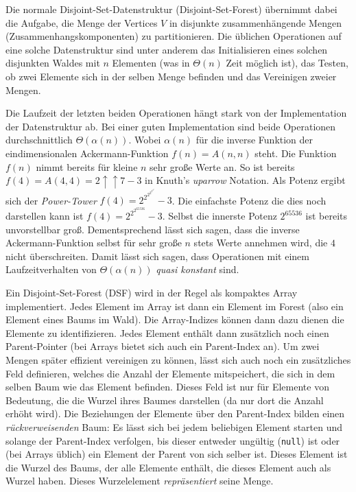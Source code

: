\documentclass{whswinvcbook}
\begin{document}
Die normale Disjoint-Set-Datenstruktur (Disjoint-Set-Forest) \cite{dsf} übernimmt dabei die Aufgabe, die Menge der Vertices $V$ in disjunkte zusammenhängende Mengen (Zusammenhangskomponenten) zu partitionieren. Die üblichen Operationen auf eine solche Datenstruktur sind unter anderem das Initialisieren eines solchen disjunkten Waldes mit $n$ Elementen (was in $\Theta(n)$ Zeit möglich ist), das Testen, ob zwei Elemente sich in der selben Menge befinden und das Vereinigen zweier Mengen.

Die Laufzeit der letzten beiden Operationen hängt stark von der Implementation der Datenstruktur ab. Bei einer guten Implementation sind beide Operationen durchschnittlich $\Theta(\alpha(n))$.\cite{dsf-log,dsf-lower,tarjan,tarjan2,tarjan3} Wobei $\alpha(n)$ für die inverse Funktion der eindimensionalen Ackermann-Funktion $f(n)=A(n,n)$ steht. Die Funktion $f(n)$ nimmt bereits für kleine $n$ sehr große Werte an. So ist bereits $f(4)=A(4,4)=2\uparrow\uparrow7-3$ in Knuth's \textit{uparrow} Notation. Als Potenz ergibt sich der \textit{Power-Tower} $f(4)=2^{2^{2^{2^{2^{2^2}}}}}-3$. Die einfachste Potenz die dies noch darstellen kann ist $f(4)=2^{2^{2^{65536}}}-3$. Selbst die innerste Potenz $2^{65536}$ ist bereits unvorstellbar groß. Dementsprechend lässt sich sagen, dass die inverse Ackermann-Funktion selbst für sehr große $n$ stets Werte annehmen wird, die $4$ nicht überschreiten. Damit lässt sich sagen, dass Operationen mit einem Laufzeitverhalten von $\Theta(\alpha(n))$ \textit{quasi konstant} sind.

Ein Disjoint-Set-Forest (DSF) wird in der Regel als kompaktes Array implementiert. Jedes Element im Array ist dann ein Element im Forest (also ein Element eines Baums im Wald). Die Array-Indizes können dann dazu dienen die Elemente zu identifizieren. Jedes Element enthält dann zusätzlich noch einen Parent-Pointer (bei Arrays bietet sich auch ein Parent-Index an). Um zwei Mengen später effizient vereinigen zu können, lässt sich auch noch ein zusätzliches Feld definieren, welches die Anzahl der Elemente mitspeichert, die sich in dem selben Baum wie das Element befinden. Dieses Feld ist nur für Elemente von Bedeutung, die die Wurzel ihres Baumes darstellen (da nur dort die Anzahl erhöht wird). Die Beziehungen der Elemente über den Parent-Index bilden einen \textit{rückverweisenden} Baum: Es lässt sich bei jedem beliebigen Element starten und solange der Parent-Index verfolgen, bis dieser entweder ungültig (\texttt{null}) ist oder (bei Arrays üblich) ein Element der Parent von sich selber ist. Dieses Element ist die Wurzel des Baums, der alle Elemente enthält, die dieses Element auch als Wurzel haben. Dieses Wurzelelement \textit{repräsentiert} seine Menge.
\end{document}
